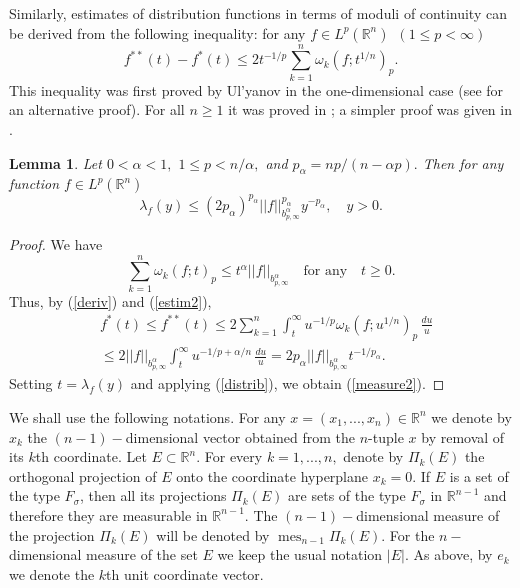 \documentclass[12pt,twoside,reqno]{amsart}
\numberwithin{equation}{section}
\newtheorem{lem}[teo]{Lemma}
\theoremstyle{definition}
\numberwithin{equation}{section}
\begin{document}
Similarly, estimates of distribution functions in terms of moduli of
continuity can be derived from the following inequality: for any $f\in L^p({\mathbb{R}}^n)\,\,\,(1\le p<\infty)$
\begin{equation}\label{estim2}
f^{**}(t) - f^*(t)\le 2 t^{-1/p}\sum_{k=1}^n{\omega}_k(f; t^{1/n})_p.
\end{equation}
This  inequality was first proved by  Ul'yanov \cite{U} in the
one-dimensional case (see \cite[p. 148]{K1998} for an alternative
proof). For all $n\ge 1$ it was proved in \cite{K1975}; a simpler proof was given in
\cite[Theorem 1]{K1988}.

\begin{lem}\label{MEASURE2} Let $0<{\alpha}<1,$  $1\le p< n/{\alpha},$ and
$p_{\alpha}=np/(n-{\alpha} p).$ Then for any function $f\in L^p({\mathbb{R}}^n)$
\begin{equation}\label{measure2}
\lambda_f(y)\le (2p_{\alpha})^{p_{\alpha}}||f||_{b_{p,\infty}^{\alpha}}^{p_{\alpha}}y^{-p_{\alpha}}, \quad y>0.
\end{equation}
\end{lem}
\begin{proof} We have
$$
\sum_{k=1}^n{\omega}_k(f;t)_p\le t^{\alpha} ||f||_{b_{p,\infty}^{\alpha}}\quad\mbox{for any}\quad t\ge 0.
$$
 Thus, by (\ref{deriv}) and (\ref{estim2}),
$$
\begin{aligned}
&f^*(t)\le f^{**}(t)\le 2\sum_{k=1}^n\int_t^\infty u^{-1/p}{\omega}_k(f;u^{1/n})_p\,\frac{du}{u}\\
&\le 2||f||_{b_{p,\infty}^{\alpha}}\int_t^\infty u^{-1/p+{\alpha}/n}\,\frac{du}{u}=2p_{\alpha}||f||_{b_{p,\infty}^{\alpha}} t^{-1/p_{\alpha}}.
\end{aligned}
$$
Setting  $t={\lambda }_f(y)$ and applying (\ref{distrib}), we obtain
(\ref{measure2}).
\end{proof}

We shall use the following notations. For any $x=(x_1,...,x_n)\in
{\mathbb{R}}^n$ we denote by $\widehat{x}_k$ the $(n-1)-$dimensional vector
obtained from the $n$-tuple $x$ by removal of its $k$th coordinate.
Let $E\subset {\mathbb{R}}^n.$ For every $k=1,...,n,$ denote by $\Pi_k(E)$ the
orthogonal projection of $E$ onto the coordinate hyperplane $x_k=0.$
If $E$ is a set of the type $F_{\sigma}$, then all its projections $\Pi_k(E)$ are
sets of the type $F_{\sigma}$ in ${\mathbb{R}}^{n-1}$ and therefore they are
measurable in ${\mathbb{R}}^{n-1}$. The $(n-1)-$dimensional measure of the
projection $\Pi_k(E)$ will be denoted by ${\operatorname{mes}}_{n-1}\Pi_k(E)$. For the
$n-$dimensional measure of the set $E$ we keep the usual notation
$|E|.$ As above, by $e_k$ we denote the $k$th unit coordinate vector.
\end{document}
